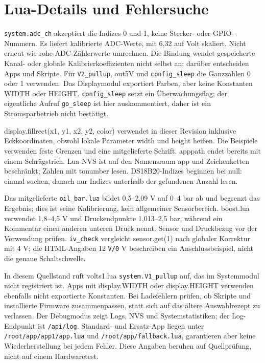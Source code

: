 \section{Lua-Details und Fehlersuche}
\nolinkurl{system.adc_ch} akzeptiert die Indizes 0 und 1, keine Stecker- oder GPIO-Nummern. Es liefert kalibrierte ADC-Werte, mit 6,32 auf Volt skaliert. Nicht erneut wie rohe ADC-Zählerwerte umrechnen. Die Bindung wendet gespeicherte Kanal- oder globale Kalibrierkoeffizienten nicht selbst an; darüber entscheiden Apps und Skripte. Für \nolinkurl{V2_pullup}, out5V und \nolinkurl{config_sleep} die Ganzzahlen 0 oder 1 verwenden. Das Displaymodul exportiert Farben, aber keine Konstanten WIDTH oder HEIGHT. \nolinkurl{config_sleep} setzt ein Überwachungsflag; der eigentliche Aufruf \nolinkurl{go_sleep} ist hier auskommentiert, daher ist ein Stromsparbetrieb nicht bestätigt.

display.fillrect(x1, y1, x2, y2, color) verwendet in dieser Revision inklusive Eckkoordinaten, obwohl lokale Parameter width und height heißen. Die Beispiele verwenden feste Grenzen und eine mitgelieferte Schrift. apppath endet bereits mit einem Schrägstrich. Lua-NVS ist auf den Namensraum app und Zeichenketten beschränkt; Zahlen mit tonumber lesen. DS18B20-Indizes beginnen bei null: einmal suchen, danach nur Indizes unterhalb der gefundenen Anzahl lesen.

Das mitgelieferte \nolinkurl{oil_bar.lua} bildet 0,5–2,09 V auf 0–4 bar ab und begrenzt das Ergebnis; dies ist seine Kalibrierung, kein allgemeiner Sensorbereich. boost.lua verwendet 1,8–4,5 V und Druckendpunkte 1,013–2,5 bar, während ein Kommentar einen anderen unteren Druck nennt. Sensor und Druckbezug vor der Verwendung prüfen. \nolinkurl{iv_check} vergleicht sensor.get(1) nach globaler Korrektur mit 4 V; die HTML-Angaben 12 \nolinkurl{V/0} V beschreiben ein Anschlussbeispiel, nicht die genaue Schaltschwelle.

In diesem Quellstand ruft volts1.lua \nolinkurl{system.V1_pullup} auf, das im Systemmodul nicht registriert ist. Apps mit display.WIDTH oder display.HEIGHT verwenden ebenfalls nicht exportierte Konstanten. Bei Ladefehlern prüfen, ob Skripte und installierte Firmware zusammenpassen, statt sich auf das ältere Auswahlrezept zu verlassen. Der Debugmodus zeigt Logs, NVS und Systemstatistiken; der Log-Endpunkt ist \nolinkurl{/api/log}. Standard- und Ersatz-App liegen unter \nolinkurl{/root/app/app1/app.lua} und \nolinkurl{/root/app/fallback.lua}, garantieren aber keine Wiederherstellung bei jedem Fehler. Diese Angaben beruhen auf Quellprüfung, nicht auf einem Hardwaretest.

